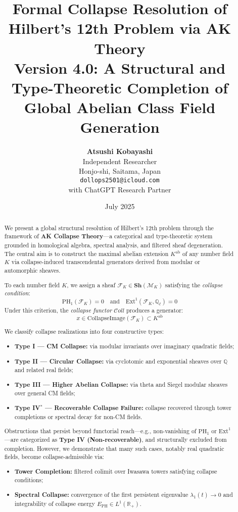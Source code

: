 \documentclass[11pt]{article}
\title{Formal Collapse Resolution of Hilbert's 12th Problem via AK Theory\\
\Large Version 4.0: A Structural and Type-Theoretic Completion of Global Abelian Class Field Generation}
\author{
  \textbf{Atsushi Kobayashi} \\
  Independent Researcher\\
  Honjo-shi, Saitama, Japan\\
  \small \texttt{dollops2501@icloud.com}\\
  \small with ChatGPT Research Partner
}
\date{July 2025}
\begin{document}
\maketitle
\tableofcontents
\newpage



\begin{abstract}
We present a global structural resolution of Hilbert’s 12th problem through the framework of \textbf{AK Collapse Theory}—a categorical and type-theoretic system grounded in homological algebra, spectral analysis, and filtered sheaf degeneration. The central aim is to construct the maximal abelian extension \( K^{\mathrm{ab}} \) of any number field \( K \) via collapse-induced transcendental generators derived from modular or automorphic sheaves.

To each number field \( K \), we assign a sheaf \( \mathcal{F}_K \in \mathbf{Sh}(\mathcal{M}_K) \) satisfying the \emph{collapse condition}:
\[
\mathrm{PH}_1(\mathcal{F}_K) = 0 \quad \text{and} \quad \mathrm{Ext}^1(\mathcal{F}_K, \mathbb{Q}_\ell) = 0
\]
Under this criterion, the \emph{collapse functor} \( \mathcal{C}oll \) produces a generator:
\[
x \in \text{CollapseImage}(\mathcal{F}_K) \subset K^{\mathrm{ab}}
\]

We classify collapse realizations into four constructive types:
\begin{itemize}
  \item \textbf{Type I — CM Collapse:} via modular invariants over imaginary quadratic fields;
  \item \textbf{Type II — Circular Collapse:} via cyclotomic and exponential sheaves over \( \mathbb{Q} \) and related real fields;
  \item \textbf{Type III — Higher Abelian Collapse:} via theta and Siegel modular sheaves over general CM fields;
  \item \textbf{Type IV$^\ast$ — Recoverable Collapse Failure:} collapse recovered through tower completions or spectral decay for non-CM fields.
\end{itemize}

Obstructions that persist beyond functorial reach—e.g., non-vanishing of \( \mathrm{PH}_1 \) or \( \mathrm{Ext}^1 \)—are categorized as \textbf{Type IV (Non-recoverable)}, and structurally excluded from completion. However, we demonstrate that many such cases, notably real quadratic fields, become collapse-admissible via:
\begin{itemize}
  \item \textbf{Tower Completion:} filtered colimit over Iwasawa towers satisfying collapse conditions;
  \item \textbf{Spectral Collapse:} convergence of the first persistent eigenvalue \( \lambda_1(t) \to 0 \) and integrability of collapse energy \( E_{\mathrm{PH}} \in L^1(\mathbb{R}_+) \).
\end{itemize}


\end{abstract}
\end{document}
